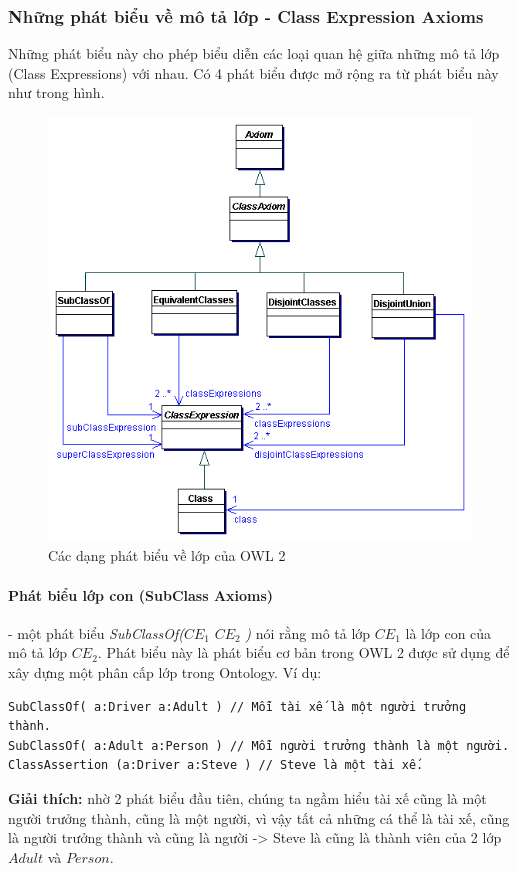 \subsubsection{Những phát biểu về mô tả lớp - Class Expression Axioms}
Những phát biểu này cho phép biểu diễn các loại quan hệ giữa những mô tả lớp (Class Expressions) với nhau. Có 4 phát biểu được mở rộng ra từ phát biểu này như trong hình.
\begin{figure}[!h]
	\centering
	\includegraphics[width=120mm]{Figures/classAxiom.png}
	\caption{Các dạng phát biểu về lớp của OWL 2\label{overflow}}
\end{figure}

\paragraph{Phát biểu lớp con (SubClass Axioms)} - một phát biểu \textit{SubClassOf(}$CE_{1}$ $CE_{2}$ \textit{)} nói rằng mô tả lớp $CE_{1}$ là lớp con của mô tả lớp $CE_{2}$. Phát biểu này là phát biểu cơ bản trong OWL 2 được sử dụng để xây dựng một phân cấp lớp trong Ontology. Ví dụ:
\begin{verbatim}
SubClassOf( a:Driver a:Adult ) // Mỗi tài xế là một người trưởng thành.
SubClassOf( a:Adult a:Person ) // Mỗi người trưởng thành là một người.
ClassAssertion (a:Driver a:Steve ) // Steve là một tài xế.
\end{verbatim}
\textbf{Giải thích:} nhờ 2 phát biểu đầu tiên, chúng ta ngầm hiểu tài xế cũng là một người trưởng thành, cũng là một người, vì vậy tất cả những cá thể là tài xế, cũng là người trưởng thành và cũng là người -> Steve là cũng là thành viên của 2 lớp $Adult$ và $Person$.


